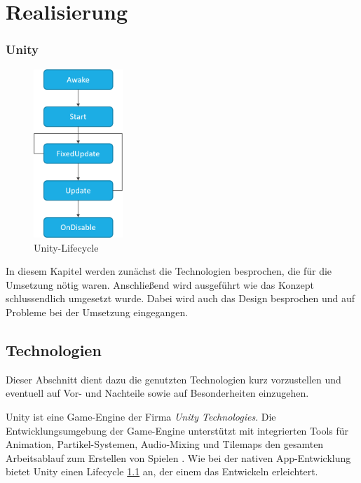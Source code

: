 \chapter{Realisierung}
\label{cha:realisierung}

\subsection{Unity}
\begin{figure}
    \centering
    \includegraphics[width=0.3\textwidth]{img/realisierung/Lifecycle}
      \caption{Unity-Lifecycle}
      \label{fig:realisierung:technologien:lifecycle}
\end{figure}

In diesem Kapitel werden zunächst die Technologien besprochen, die für die Umsetzung nötig waren. Anschließend wird ausgeführt wie das Konzept schlussendlich umgesetzt wurde. Dabei wird auch das Design besprochen und auf Probleme bei der Umsetzung eingegangen.

\section{Technologien}
\label{sec:grundlagen:technologien}
Dieser Abschnitt dient dazu die genutzten Technologien kurz vorzustellen und eventuell auf Vor- und Nachteile sowie auf Besonderheiten einzugehen.

\label{subsec:realisierung:technologien:unity}
Unity ist eine Game-Engine der Firma \textit{Unity Technologies}. Die Entwicklungsumgebung der Game-Engine unterstützt mit integrierten Tools für Animation, Partikel-Systemen, Audio-Mixing und Tilemaps den gesamten Arbeitsablauf zum Erstellen von Spielen \cite{unity_mobile}. Wie bei der nativen App-Entwicklung bietet Unity einen Lifecycle \ref{fig:realisierung:technologien:lifecycle} an, der einem das Entwickeln erleichtert. 

